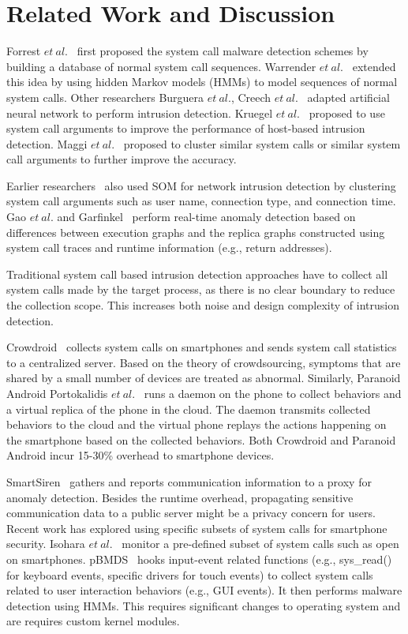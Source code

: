 \chapter{Related Work and Discussion}
\thispagestyle{plain}

\label{Related Work and Discussion}

Forrest \(et\ al.\)~\cite{32} first proposed the system call malware detection schemes by building a database of normal system call sequences. Warrender \(et\ al.\)~\cite{warrender1999detecting} extended this idea by using hidden Markov models (HMMs) to model sequences of normal system calls. Other researchers Burguera \(et\ al.\), Creech \(et\ al.\)~\cite{34,35} adapted artificial neural network to perform intrusion detection. Kruegel \(et\ al.\)~\cite{36} proposed to use system call arguments to improve the performance of host-based intrusion detection. Maggi \(et\ al.\)~\cite{37} proposed to cluster similar system calls or similar system call arguments to further improve the accuracy. 

Earlier researchers~\cite{38,39} also used SOM for network intrusion detection by clustering system call arguments such as user name, connection type, and connection time. Gao \(et\ al.\) and Garfinkel~\cite{40,41} perform real-time anomaly detection based on differences between execution graphs and the replica graphs constructed using system call traces and runtime information (e.g., return addresses). 

Traditional system call based intrusion detection approaches have to collect all system calls made by the target process, as there is no clear boundary to reduce the collection scope. This increases both noise and design complexity of intrusion detection.

Crowdroid~\cite{34} collects system calls on smartphones and sends system call statistics to a centralized server. Based on the theory of crowdsourcing, symptoms that are shared by a small number of devices are treated as abnormal. Similarly, Paranoid Android Portokalidis \(et\ al.\)~\cite{42} runs a daemon on the phone to collect behaviors and a virtual replica of the phone in the cloud. The daemon transmits collected behaviors to the cloud and the virtual phone replays the actions happening on the smartphone based on the collected behaviors. Both Crowdroid and Paranoid Android incur 15-30\% overhead to smartphone devices. 

SmartSiren~\cite{43} gathers and reports communication information to a proxy for anomaly detection. Besides the runtime overhead, propagating sensitive communication data to a public server might be a privacy concern for users. Recent work has explored using specific subsets of system calls for smartphone security. Isohara \(et\ al.\)~\cite{44} monitor a pre-defined subset of system calls such as open on smartphones. pBMDS~\cite{45} hooks input-event related functions (e.g., sys\_read() for keyboard events, specific drivers for touch events) to collect system calls related to user interaction behaviors (e.g., GUI events). It then performs malware detection using HMMs. This requires significant changes to operating system and are requires custom kernel modules.


